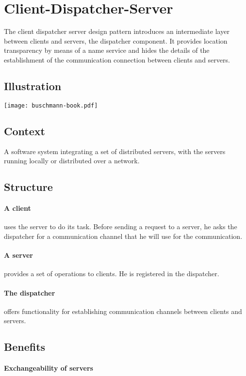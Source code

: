 \documentclass[a4paper,11pt,twocolumn]{report}
\begin{document}
    \section{Client-Dispatcher-Server}
    The client dispatcher server design pattern introduces an intermediate
    layer between clients and servers, the dispatcher component. It provides
    location transparency by means of a name service and hides the details of
    the establishment of the communication connection between clients and
    servers.
    \subsection{Illustration}
    \texttt{[image: buschmann-book.pdf]}
    \subsection{Context}
    A software system integrating a set of distributed servers, with the
    servers running locally or distributed over a network.
    \subsection{Structure}
    \paragraph{A client} uses the server to do its task. Before sending a
    request to a server, he asks the dispatcher for a communication channel
    that he will use for the communication.
    \paragraph{A server} provides a set of operations to clients. He is
    registered in the dispatcher.
    \paragraph{The dispatcher} offers functionality for establishing
    communication channels between clients and servers.
    \subsection{Benefits}
    \paragraph{Exchangeability of servers}
\end{document}
